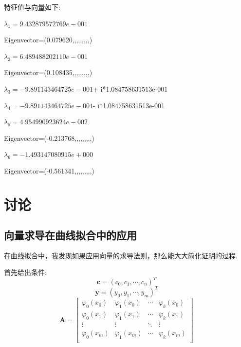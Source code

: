 特征值与向量如下:

$\lambda_{1}= 9.432879572769e-001$ 

Eigenvector=(0.079620,,,,,,,,,)


\vbox{}
$\lambda_{2}= 6.489488202110e-001$ 

Eigenvector=(0.108435,,,,,,,,,)


\vbox{}
$\lambda_{3}= -9.891143464725e-001$+ i*1.084758631513e-001


\vbox{}
$\lambda_{4}= -9.891143464725e-001$- i*1.084758631513e-001


\vbox{}
$\lambda_{5}= 4.954990923624e-002$ 

Eigenvector=(-0.213768,,,,,,,,,)


\vbox{}
$\lambda_{6}= -1.493147080915e+000$ 

Eigenvector=(-0.561341,,,,,,,,,)




\chapter{讨论}
\label{sec:discuss}
\section{向量求导在曲线拟合中的应用}
在曲线拟合中，我发现如果应用向量的求导法则，那么能大大简化证明的过程.

首先给出条件:
\[\bm{c}=(c_0,c_1,\cdots,c_n)^T\]
\[\bm{y}=(y_0,y_1,\cdots,y_m)^T\]
\[\bm{A} =
\begin{bmatrix}
{\varphi_{0}(x_0)}&{\varphi_{1}(x_0)}& \cdots &{\varphi_{k}(x_0)}\\
{\varphi_{0}(x_1)}&{\varphi_{1}(x_1)}& \cdots &{\varphi_{k}(x_1)}\\
 \vdots & \vdots & \ddots & \vdots \\
{\varphi_{0}(x_m)}&{\varphi_{1}(x_m)}& \cdots &{\varphi_{k}(x_m)}\\
\end{bmatrix}\]



